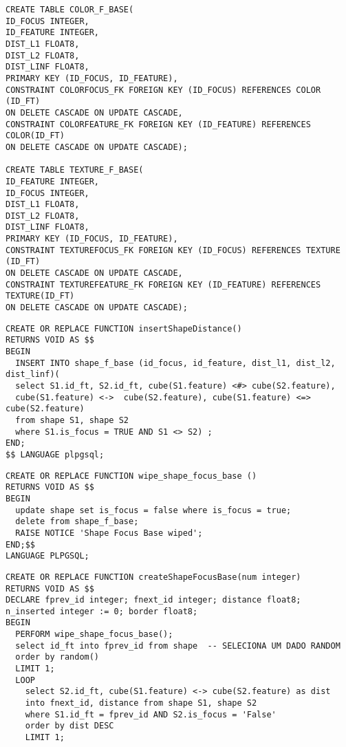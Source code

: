 \begin{apendicesenv}
\begin{lstlisting}[caption={Criação das tabelas OMNI}, captionpos=t,basicstyle=\tiny]
CREATE TABLE COLOR_F_BASE(
ID_FOCUS INTEGER,
ID_FEATURE INTEGER,
DIST_L1 FLOAT8,
DIST_L2 FLOAT8,
DIST_LINF FLOAT8,
PRIMARY KEY (ID_FOCUS, ID_FEATURE),
CONSTRAINT COLORFOCUS_FK FOREIGN KEY (ID_FOCUS) REFERENCES COLOR (ID_FT)
ON DELETE CASCADE ON UPDATE CASCADE,
CONSTRAINT COLORFEATURE_FK FOREIGN KEY (ID_FEATURE) REFERENCES COLOR(ID_FT)
ON DELETE CASCADE ON UPDATE CASCADE);

CREATE TABLE TEXTURE_F_BASE(
ID_FEATURE INTEGER,
ID_FOCUS INTEGER,
DIST_L1 FLOAT8,
DIST_L2 FLOAT8,
DIST_LINF FLOAT8,
PRIMARY KEY (ID_FOCUS, ID_FEATURE),
CONSTRAINT TEXTUREFOCUS_FK FOREIGN KEY (ID_FOCUS) REFERENCES TEXTURE (ID_FT)
ON DELETE CASCADE ON UPDATE CASCADE,
CONSTRAINT TEXTUREFEATURE_FK FOREIGN KEY (ID_FEATURE) REFERENCES TEXTURE(ID_FT)
ON DELETE CASCADE ON UPDATE CASCADE);
\end{lstlisting}

\begin{lstlisting}[caption={Inserção das distâncias na tabela de focos}, captionpos=t,basicstyle=\tiny]
CREATE OR REPLACE FUNCTION insertShapeDistance() 
RETURNS VOID AS $$
BEGIN
  INSERT INTO shape_f_base (id_focus, id_feature, dist_l1, dist_l2, dist_linf)(
  select S1.id_ft, S2.id_ft, cube(S1.feature) <#> cube(S2.feature),
  cube(S1.feature) <->  cube(S2.feature), cube(S1.feature) <=>  cube(S2.feature)
  from shape S1, shape S2 
  where S1.is_focus = TRUE AND S1 <> S2) ;
END;
$$ LANGUAGE plpgsql;  
\end{lstlisting}

\begin{lstlisting}[caption={Exclusão da base focal}, captionpos=t,basicstyle=\tiny]
CREATE OR REPLACE FUNCTION wipe_shape_focus_base () 
RETURNS VOID AS $$
BEGIN
  update shape set is_focus = false where is_focus = true;
  delete from shape_f_base;
  RAISE NOTICE 'Shape Focus Base wiped';
END;$$
LANGUAGE PLPGSQL;
\end{lstlisting}

\begin{lstlisting}[caption={Criação da base focal OMNI}, captionpos=t,basicstyle=\tiny]
CREATE OR REPLACE FUNCTION createShapeFocusBase(num integer)
RETURNS VOID AS $$
DECLARE fprev_id integer; fnext_id integer; distance float8; 
n_inserted integer := 0; border float8;
BEGIN
  PERFORM wipe_shape_focus_base();
  select id_ft into fprev_id from shape  -- SELECIONA UM DADO RANDOM
  order by random()
  LIMIT 1;
  LOOP
    select S2.id_ft, cube(S1.feature) <-> cube(S2.feature) as dist 
    into fnext_id, distance from shape S1, shape S2
    where S1.id_ft = fprev_id AND S2.is_focus = 'False'
    order by dist DESC
    LIMIT 1;


\end{lstlisting}
\end{apendicesenv}
